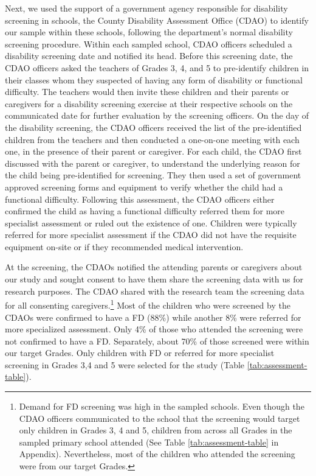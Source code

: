 \documentclass[hidelinks,12pt]{article}
\begin{document}
\begin{singlespace}
Next, we used the support of a government agency responsible for disability screening in schools, the County Disability Assessment Office (CDAO) to identify our sample within these schools, following the department's normal disability screening procedure. Within each sampled school, CDAO officers scheduled a disability screening date and notified its head. Before this screening date, the CDAO officers asked the teachers of Grades 3, 4, and 5 to pre-identify children in their classes whom they suspected of having any form of disability or functional difficulty. The teachers would then invite these children and their parents or caregivers for a disability screening exercise at their respective schools on the communicated date for further evaluation by the screening officers. On the day of the disability screening, the CDAO officers received the list of the pre-identified children from the teachers and then conducted a one-on-one meeting with each one, in the presence of their parent or caregiver. For each child, the CDAO first discussed with the parent or caregiver, to understand the underlying reason for the child being pre-identified for screening. They then used a set of government approved screening forms and equipment to verify whether the child had a functional difficulty. Following this assessment, the CDAO officers either confirmed the child as having a functional difficulty referred them for more specialist assessment or ruled out the existence of one. Children were typically referred for more specialist assessment if the CDAO did not have the requisite equipment on-site or if they recommended medical intervention.

At the screening, the CDAOs notified the attending parents or caregivers about our study and sought consent to have them share the screening data with us for research purposes. The CDAO shared with the research team the screening data for all consenting caregivers.\footnote{Demand for FD screening was high in the sampled schools. Even though the CDAO officers communicated to the school that the screening would target only children in Grades 3, 4 and 5, children from across all Grades in the sampled primary school attended (See Table \ref{tab:assessment-table} in Appendix). Nevertheless, most of the children who attended the screening were from our target Grades.} Most of the children who were screened by the CDAOs were confirmed to have a FD (88\%) while another 8\% were referred for more specialized assessment. Only 4\% of those who attended the screening were not confirmed to have a FD. Separately, about 70\% of those screened were within our target Grades. Only children with FD or referred for more specialist screening in Grades 3,4 and 5 were selected for the study (Table \ref{tab:assessment-table}). 


\end{singlespace}
\end{document}
